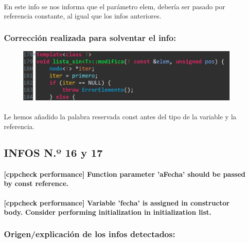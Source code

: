 			\paragraph{}En este info se nos informa que el parámetro elem, debería ser pasado por referencia constante, al igual que los infos anteriores.
			
		\subsubsection{Corrección realizada para solventar el info:}
		
			\begin{figure}[H]
				\centering
				\includegraphics[scale=0.55]{img/esteban23.png}
				\label{esteban23}
			\end{figure}
		
			\paragraph{}Le hemos añadido la palabra reservada const antes del tipo de la variable y la referencia.
			
	\subsection{INFOS N.º 16 y 17}
	
		\paragraph{[cppcheck performance] Function parameter 'aFecha' should be passed by const reference.}
		
		\paragraph{[cppcheck performance] Variable 'fecha' is assigned in constructor body. Consider performing initialization in initialization list.}
	
		\subsubsection{Origen/explicación de los infos detectados:}
		
